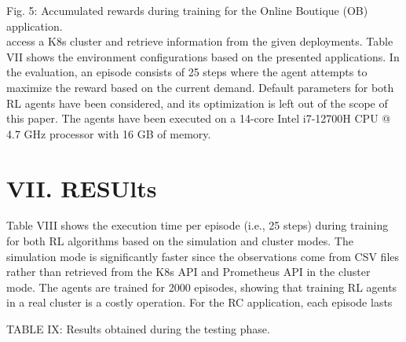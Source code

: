 \documentclass[10pt]{article}
\begin{document}
Fig. 5: Accumulated rewards during training for the Online Boutique (OB) application.\\
access a K8s cluster and retrieve information from the given deployments. Table VII shows the environment configurations based on the presented applications. In the evaluation, an episode consists of 25 steps where the agent attempts to maximize the reward based on the current demand. Default parameters for both RL agents have been considered, and its optimization is left out of the scope of this paper. The agents have been executed on a 14-core Intel i7-12700H CPU @ 4.7 GHz processor with 16 GB of memory.

\section*{VII. RESUlts}
Table VIII shows the execution time per episode (i.e., 25 steps) during training for both RL algorithms based on the simulation and cluster modes. The simulation mode is significantly faster since the observations come from CSV files rather than retrieved from the K8s API and Prometheus API in the cluster mode. The agents are trained for 2000 episodes, showing that training RL agents in a real cluster is a costly operation. For the RC application, each episode lasts

TABLE IX: Results obtained during the testing phase.
\end{document}
